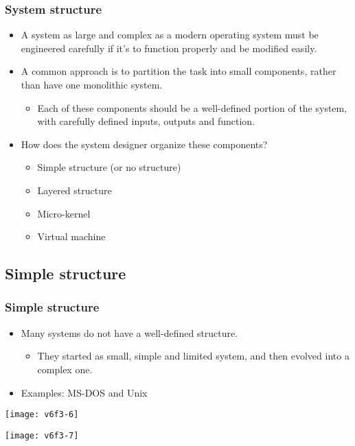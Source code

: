 \documentclass[CJKutf8,dvipsnames,table]{beamer}
\begin{document}
\begin{CJK*}{UTF8}{song}
  \begin{frame}
    \frametitle{System structure} \pause
    \begin{itemize}
    \item A system as large and complex as a modern operating system must be engineered carefully if it's to function properly and be modified easily.  \pause
    \item A common approach is to partition the task into small components, rather than have one monolithic system.  \pause
      \begin{itemize}
      \item Each of these components should be a well-defined portion of the system, with carefully defined inputs, outputs and function.  \pause
      \end{itemize}
    \item How does the system designer organize these components?  \pause
      \begin{itemize}
      \item Simple structure (or no structure)  \pause
      \item Layered structure  \pause
      \item Micro-kernel  \pause
      \item Virtual machine 
      \end{itemize}
    \end{itemize}
  \end{frame}

  \subsection{Simple structure}

  \begin{frame}
    \frametitle{Simple structure} \pause
    \begin{itemize}
    \item Many systems do not have a well-defined structure.  \pause
      \begin{itemize}
      \item They started as small, simple and limited system, and then evolved into a complex one.  \pause
      \end{itemize}
    \item Examples: MS-DOS and Unix  \pause
    \end{itemize}
    \begin{minipage}[c]{0.5\textwidth}
      \texttt{[image: v6f3-6]} \pause
    \end{minipage}%
    \begin{minipage}[c]{0.5\textwidth}
      \texttt{[image: v6f3-7]}
    \end{minipage}
  \end{frame}


\end{CJK*}
\end{document}

